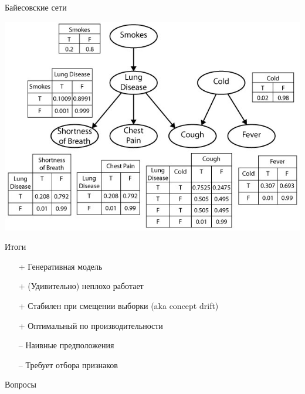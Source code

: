 \documentclass[10pt]{beamer}
\begin{document}
\begin{frame}{Байесовские сети}

\begin{center}
\includegraphics[scale=0.4]{images/network.jpg}
\end{center}

\end{frame}


\begin{frame}{Итоги}

\begin{itemize}
\item[+] Генеративная модель
\item[+] (Удивительно) неплохо работает
\item[+] Стабилен при смещении выборки (aka concept drift)
\item[+] Оптимальный по производительности
\end{itemize}

\begin{itemize}
\item[--] Наивные предположения
\item[--] Требует отбора признаков
\end{itemize}

\end{frame}


\begin{frame}{}

\begin{center}
\Large Вопросы
\end{center}

\end{frame}
\end{document}
